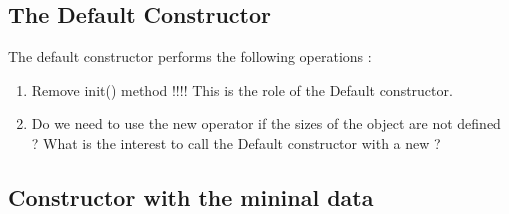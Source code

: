 
   





\subsection{The Default Constructor}

The default constructor performs the following operations :







\begin{ndr}
  \begin{enumerate}
  \item Remove init() method !!!! This is the role of the Default constructor.
  \item Do we need to use the new operator if the sizes of the object are not defined ? What is the interest to call the Default constructor with a new ?
  \end{enumerate}

\end{ndr}

\subsection{Constructor with the mininal data}


